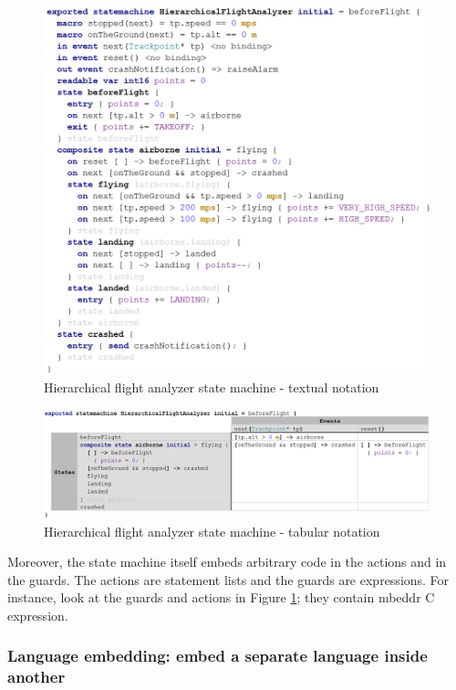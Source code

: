 \documentclass[preprint,numbers,10pt]{sigplanconf}
\begin{document}
\begin{figure}[H]
	\centering
	\includegraphics[scale=0.5]{screens/HierarchicalFlightAnalyzerT}
	\caption{Hierarchical flight analyzer state machine - textual notation}
	\label{fig:HFAT}
\end{figure}

\begin{figure}[ht!]
	\centering
	\includegraphics[scale=0.55]{screens/HierarchicalFlightAnalyzerTab}
	\caption{Hierarchical flight analyzer state machine - tabular notation}
	\label{fig:HFATab}
\end{figure}

Moreover, the state machine itself embeds arbitrary code in the actions
and in the guards. The actions are statement lists and the guards are expressions.
For instance, look at the guards and actions in Figure \ref{fig:HFAT}; they contain mbeddr C expression.

\subsubsection{Language embedding: embed a separate language inside another}
\label{evr:langembed}
\end{document}
